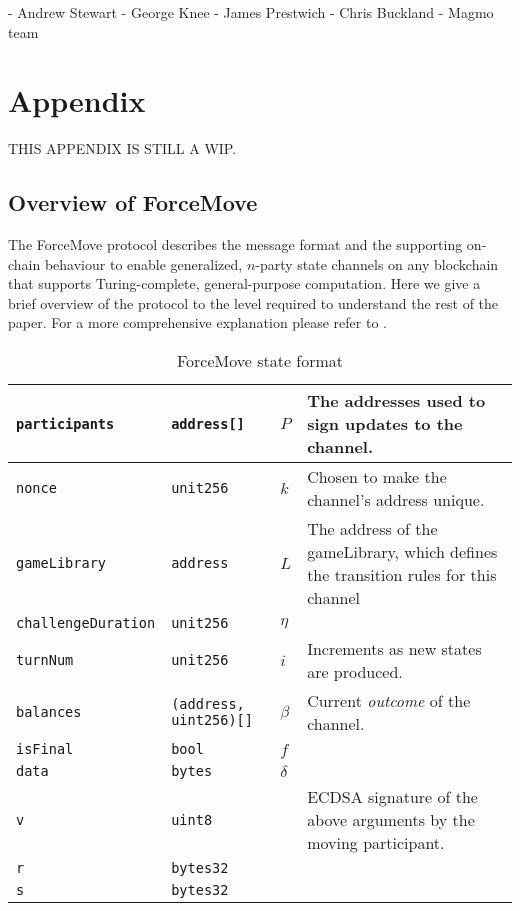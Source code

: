 \documentclass{article}
\begin{document}
- Andrew Stewart
- George Knee
- James Prestwich
- Chris Buckland
- Magmo team

\newpage

\section{Appendix}

THIS APPENDIX IS STILL A WIP.

\subsection{Overview of ForceMove}

The ForceMove protocol describes the message format and the supporting on-chain behaviour
to enable generalized, $n$-party state channels on any blockchain that supports Turing-complete, general-purpose computation.
Here we give a brief overview of the protocol to the level required to understand
the rest of the paper. For a more comprehensive explanation please refer to \cite{}.

\begin{table}[h]
  \begin{tabular}{|l|l|l|p{5cm}|}
    \hline
    \texttt{participants} & \texttt{address[]} & $P$ & The addresses used to sign updates to the channel. \\ \hline
    \texttt{nonce} & \texttt{unit256} & $k$ & Chosen to make the channel's address unique. \\ \hline
    \texttt{gameLibrary} & \texttt{address} & $L$ & The address of the gameLibrary, which defines the transition rules for this channel \\ \hline
    \texttt{challengeDuration} & \texttt{unit256} & $\eta$ & \\ \hline
    \texttt{turnNum} & \texttt{unit256} & $i$ & Increments as new states are produced. \\ \hline
    \texttt{balances} & \texttt{(address, uint256)[]} & $\beta$ & Current \textit{outcome} of the channel. \\ \hline
    \texttt{isFinal} & \texttt{bool} & $f$ & \\ \hline
    \texttt{data} & \texttt{bytes} & $\delta$ & \\ \hline
    \texttt{v} & \texttt{uint8} & &  ECDSA signature of the above arguments by the moving participant. \\ \cline{1-2}
    \texttt{r} & \texttt{bytes32} & & \\ \cline{1-2}
    \texttt{s} & \texttt{bytes32} & & \\ \hline
  \end{tabular}
  \caption{ForceMove state format}
  \label{table:force-move-state}
\end{table}
\end{document}
